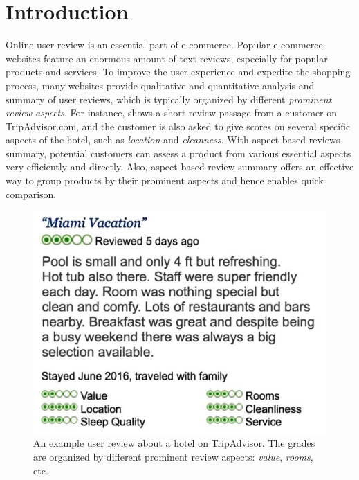 \section{Introduction}
\label{sec:intro}

Online user review is an essential part of e-commerce. 
Popular e-commerce websites feature an enormous amount of text reviews, 
especially for popular products and services. 
To improve the user experience and expedite the
shopping process, many websites provide qualitative and quantitative
analysis and summary of user reviews, which is typically organized by different 
{\em prominent review aspects}.
For instance,  shows a short review passage from a customer on TripAdvisor.com, and the customer is also asked
to give scores on several specific aspects of 
the hotel, such as \textit{location} and \textit{cleanness}. 
%
With aspect-based reviews summary, potential customers can 
assess a product from various essential aspects very efficiently and directly.
Also, aspect-based review summary offers an effective 
way to group products by their prominent aspects and hence
enables quick comparison.
\begin{figure}[th!]
	\centering
	\includegraphics[width=0.6\columnwidth]{figures/tripadvisor}
	\caption{An example user review about a hotel on TripAdvisor. 
		The grades are organized by different prominent review aspects: \textit{value}, \textit{rooms}, etc. }
	\label{fig:tripadvisor}
\end{figure}                                
